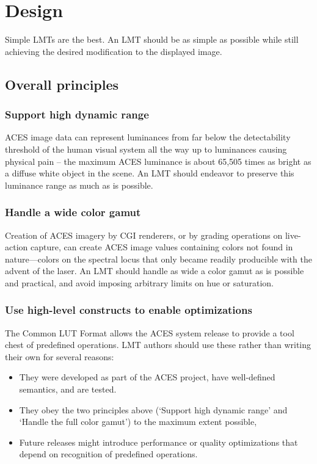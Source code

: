 \regularsectionformat	%
\chapter{Design}

Simple LMTs are the best. An LMT should be as simple as possible while still achieving the desired modification to the displayed image.

\section{Overall principles}

\subsection{Support high dynamic range}
ACES image data can represent luminances from far below the detectability threshold of the human visual system all the way up to luminances causing physical pain -- the maximum ACES luminance is about 65,505 times as bright as a diffuse white object in the scene. An LMT should endeavor to preserve this luminance range as much as is possible. 

\subsection{Handle a wide color gamut}
Creation of ACES imagery by CGI renderers, or by grading operations on live-action capture, can create ACES image values containing colors not found in nature—colors on the spectral locus that only became readily producible with the advent of the laser. An LMT should handle as wide a color gamut as is possible and practical, and avoid imposing arbitrary limits on hue or saturation. 

\subsection{Use high-level constructs to enable optimizations}
The Common LUT Format allows the ACES system release to provide a tool chest of predefined operations. LMT authors should use these rather than writing their own for several reasons:

\begin{itemize}
    \item   They were developed as part of the ACES project, have well-defined semantics, and are tested.
    \item   They obey the two principles above (‘Support high dynamic range’ and ‘Handle the full color gamut’) to the maximum extent possible,
    \item   Future releases might introduce performance or quality optimizations that depend on recognition of predefined operations.
\end{itemize}

